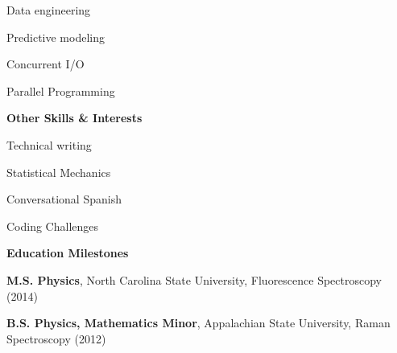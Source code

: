 \documentclass[letterpaper,final]{memoir}
\newcommand{\LargeSep}{\vspace{1.3em}}
\newcommand{\Sep}{\vspace{1.0em}}
\newcommand{\SmallSep}{\vspace{0.4em}}
\newcommand{\CVSection}[1]
	{\LARGE\textbf{#1}\par
	\SmallSep\normalsize}
\newcommand{\CVItem}[1]
	{\textbf{\color{Blue} #1}}
\begin{document}
\begin{multicols}{4}

    \begin{compactitem}[\color{Blue}$\circ$]

        \item Data engineering
        \SmallSep

        \item Predictive modeling
        \SmallSep
   
        \item Concurrent I/O
        \SmallSep

        \item Parallel Programming
        
	\end{compactitem}

\end{multicols}

\Sep
\CVItem{Other Skills \& Interests}
\SmallSep

\begin{multicols}{4}

    \begin{compactitem}[\color{Blue}$\circ$] 

        \item Technical writing
        \SmallSep

        \item Statistical Mechanics
        \SmallSep
    
        \item Conversational Spanish
        \SmallSep 

		\item Coding Challenges
	\end{compactitem}
\end{multicols}
\LargeSep


\notoserif \CVSection{Education Milestones}
\normalfont
\Sep
\begin{compactitem}[\color{Blue}$\circ$]

\item \textbf{M.S. Physics}, North Carolina State University, Fluorescence Spectroscopy (2014)
\SmallSep
\item \textbf{B.S. Physics, Mathematics Minor}, Appalachian State University, Raman Spectroscopy (2012)

\end{compactitem}
\Sep
\end{document}
